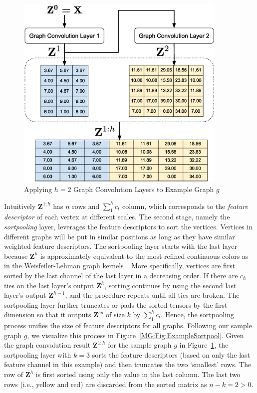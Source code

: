 \begin{figure}[htbp]
    \centerline{\includegraphics[width=0.90\textwidth]{Magic/figures/ExampleGraphConvolution.eps}}
    \caption{Applying $h=2$ Graph Convolution Layers to Example Graph $g$}
    \label{MG:Fig:ExampleGraphConvolution}
\end{figure}

 Intuitively $\mathbf{Z}^{1:h}$ has $n$ rows and $\sum_{1}^{h}c_t$ column,
which corresponds to the \textit{feature descriptor} of each vertex at different scales.
The second stage, namely the \textit{sortpooling} layer,
leverages the feature descriptors to sort the vertices.
Vertices in different graphs will be put in similar positions as long as they have similar weighted feature descriptors.
The sortpooling layer starts with the last layer because $\mathbf{Z}^{h}$ is approximately
equivalent to the most refined continuous colors as in the Weisfeiler-Lehman graph kernels~\cite{WlGraphKernel}.
More specifically, vertices are first sorted by the last channel of the last layer in a decreasing order.
If there are $c_h$ ties on the last layer's output $\mathbf{Z}^{h}$,
sorting continues by using the second last layer's output $\mathbf{Z}^{h - 1}$, and the procedure repeats until all ties are broken.
The sortpooling layer further truncates or pads the sorted tensors by the first dimension so that it outputs $\mathbf{Z}^{sp}$ of size $k$ by $\sum_{1}^{h}c_t$.
Hence, the sortpooling process unifies the size of feature descriptors for all graphs.
Following our sample graph $g$, we visualize this process in Figure~\ref{MG:Fig:ExampleSortpool}.
Given the graph convolution result $\mathbf{Z}^{1:h}$ for the sample graph $g$ in Figure~\ref{MG:Fig:ExampleGraphConvolution},
the sortpooling layer with $k = 3$ sorts the feature descriptors (based on only the last feature channel in this example) and then truncates the two `smallest' rows.
The row of $\mathbf{Z}^{h}$ is first sorted using only the value in the last column.
The last two rows (i.e., yellow and red) are discarded from the sorted matrix as $n - k = 2 > 0$.

